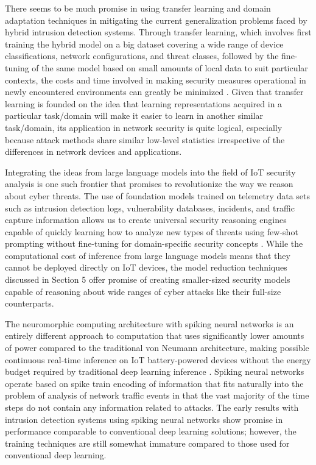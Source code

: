 \documentclass[12pt]{article}
\begin{document}
There seems to be much promise in using transfer learning and domain adaptation techniques in mitigating the current generalization problems faced by hybrid intrusion detection systems. Through transfer learning, which involves first training the hybrid model on a big dataset covering a wide range of device classifications, network configurations, and threat classes, followed by the fine-tuning of the same model based on small amounts of local data to suit particular contexts, the costs and time involved in making security measures operational in newly encountered environments can greatly be minimized \cite{thamilarasu2019towards}. Given that transfer learning is founded on the idea that learning representations acquired in a particular task/domain will make it easier to learn in another similar task/domain, its application in network security is quite logical, especially because attack methods share similar low-level statistics irrespective of the differences in network devices and applications.

Integrating the ideas from large language models into the field of IoT security analysis is one such frontier that promises to revolutionize the way we reason about cyber threats. The use of foundation models trained on telemetry data sets such as intrusion detection logs, vulnerability databases, incidents, and traffic capture information allows us to create universal security reasoning engines capable of quickly learning how to analyze new types of threats using few-shot prompting without fine-tuning for domain-specific security concepts \cite{lyu2021towards}. While the computational cost of inference from large language models means that they cannot be deployed directly on IoT devices, the model reduction techniques discussed in Section 5 offer promise of creating smaller-sized security models capable of reasoning about wide ranges of cyber attacks like their full-size counterparts.

The neuromorphic computing architecture with spiking neural networks is an entirely different approach to computation that uses significantly lower amounts of power compared to the traditional von Neumann architecture, making possible continuous real-time inference on IoT battery-powered devices without the energy budget required by traditional deep learning inference \cite{xiao2019iot}. Spiking neural networks operate based on spike train encoding of information that fits naturally into the problem of analysis of network traffic events in that the vast majority of the time steps do not contain any information related to attacks. The early results with intrusion detection systems using spiking neural networks show promise in performance comparable to conventional deep learning solutions; however, the training techniques are still somewhat immature compared to those used for conventional deep learning.
\end{document}
